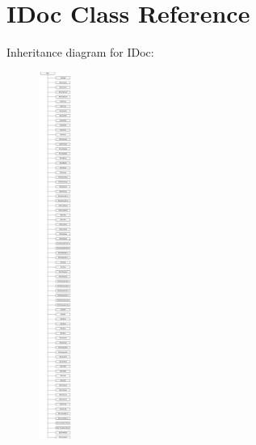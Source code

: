 \hypertarget{class_i_doc}{}\section{I\+Doc Class Reference}
\label{class_i_doc}
Inheritance diagram for I\+Doc\+:\begin{figure}[H]
\begin{center}
\leavevmode
\includegraphics[height=12.000000cm]{class_i_doc}
\end{center}
\end{figure}
